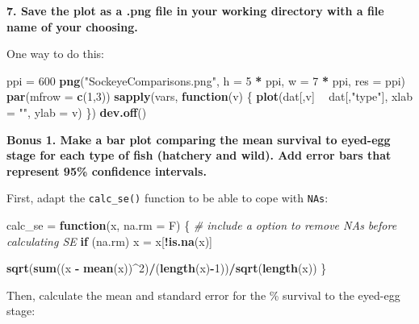 \documentclass[]{book}
\newenvironment{Shaded}{\begin{snugshade}}{\end{snugshade}}
\newcommand{\CommentTok}[1]{\textcolor[rgb]{0.56,0.35,0.01}{\textit{#1}}}
\newcommand{\ControlFlowTok}[1]{\textcolor[rgb]{0.13,0.29,0.53}{\textbf{#1}}}
\newcommand{\DataTypeTok}[1]{\textcolor[rgb]{0.13,0.29,0.53}{#1}}
\newcommand{\DecValTok}[1]{\textcolor[rgb]{0.00,0.00,0.81}{#1}}
\newcommand{\KeywordTok}[1]{\textcolor[rgb]{0.13,0.29,0.53}{\textbf{#1}}}
\newcommand{\NormalTok}[1]{#1}
\newcommand{\OperatorTok}[1]{\textcolor[rgb]{0.81,0.36,0.00}{\textbf{#1}}}
\newcommand{\StringTok}[1]{\textcolor[rgb]{0.31,0.60,0.02}{#1}}
\begin{document}
\textbf{7. Save the plot as a .png file in your working directory with a file name of your choosing.}

One way to do this:

\begin{Shaded}
\begin{Highlighting}[]
\NormalTok{ppi =}\StringTok{ }\DecValTok{600}
\KeywordTok{png}\NormalTok{(}\StringTok{"SockeyeComparisons.png"}\NormalTok{, }\DataTypeTok{h =} \DecValTok{5} \OperatorTok{*}\StringTok{ }\NormalTok{ppi, }\DataTypeTok{w =} \DecValTok{7} \OperatorTok{*}\StringTok{ }\NormalTok{ppi, }\DataTypeTok{res =}\NormalTok{ ppi)}
\KeywordTok{par}\NormalTok{(}\DataTypeTok{mfrow =} \KeywordTok{c}\NormalTok{(}\DecValTok{1}\NormalTok{,}\DecValTok{3}\NormalTok{))}
\KeywordTok{sapply}\NormalTok{(vars, }\ControlFlowTok{function}\NormalTok{(v) \{}
  \KeywordTok{plot}\NormalTok{(dat[,v] }\OperatorTok{~}\StringTok{ }\NormalTok{dat[,}\StringTok{"type"}\NormalTok{], }\DataTypeTok{xlab =} \StringTok{""}\NormalTok{, }\DataTypeTok{ylab =}\NormalTok{ v)}
\NormalTok{\})}
\KeywordTok{dev.off}\NormalTok{()}
\end{Highlighting}
\end{Shaded}

\textbf{Bonus 1. Make a bar plot comparing the mean survival to eyed-egg stage for each type of fish (hatchery and wild). Add error bars that represent 95\% confidence intervals.}

First, adapt the \texttt{calc\_se()} function to be able to cope with \texttt{NAs}:

\begin{Shaded}
\begin{Highlighting}[]
\NormalTok{calc_se =}\StringTok{ }\ControlFlowTok{function}\NormalTok{(x, }\DataTypeTok{na.rm =}\NormalTok{ F) \{}
  \CommentTok{# include a option to remove NAs before calculating SE}
  \ControlFlowTok{if}\NormalTok{ (na.rm) x =}\StringTok{ }\NormalTok{x[}\OperatorTok{!}\KeywordTok{is.na}\NormalTok{(x)]}
  
  \KeywordTok{sqrt}\NormalTok{(}\KeywordTok{sum}\NormalTok{((x }\OperatorTok{-}\StringTok{ }\KeywordTok{mean}\NormalTok{(x))}\OperatorTok{^}\DecValTok{2}\NormalTok{)}\OperatorTok{/}\NormalTok{(}\KeywordTok{length}\NormalTok{(x)}\OperatorTok{-}\DecValTok{1}\NormalTok{))}\OperatorTok{/}\KeywordTok{sqrt}\NormalTok{(}\KeywordTok{length}\NormalTok{(x))}
\NormalTok{\}}
\end{Highlighting}
\end{Shaded}

Then, calculate the mean and standard error for the \% survival to the eyed-egg stage:
\end{document}
